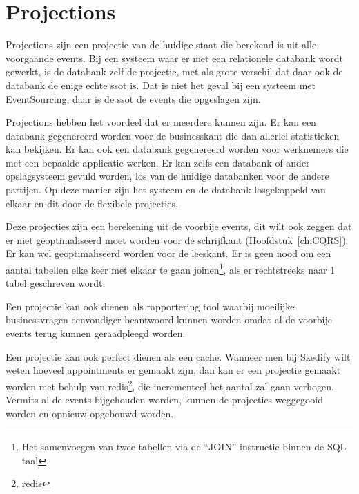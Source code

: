 
\section{Projections}
\label{sec:projections}

Projections zijn een projectie van de huidige staat die berekend is uit alle voorgaande events. Bij een systeem waar er met een relationele databank wordt gewerkt, is de databank zelf de projectie, met als grote verschil dat daar ook de databank de enige echte \gls{ssot} is. Dat is niet het geval bij een systeem met EventSourcing, daar is de \gls{ssot} de events die opgeslagen zijn.

Projections hebben het voordeel dat er meerdere kunnen zijn. Er kan een databank gegenereerd worden voor de businesskant die dan allerlei statistieken kan bekijken. Er kan ook een databank gegenereerd worden voor werknemers die met een bepaalde applicatie werken. Er kan zelfs een databank of ander opslagsysteem gevuld worden, los van de huidige databanken voor de andere partijen. Op deze manier zijn het systeem en de databank losgekoppeld van elkaar en dit door de flexibele projecties. 

Deze projecties zijn een berekening uit de voorbije events, dit wilt ook zeggen dat er niet geoptimaliseerd moet worden voor de schrijfkant (Hoofdstuk~\ref{ch:CQRS}). Er kan wel geoptimaliseerd worden voor de leeskant. Er is geen nood om een aantal tabellen elke keer met elkaar te gaan joinen\footnote{Het samenvoegen van twee tabellen via de ``JOIN'' instructie binnen de \gls{SQL} taal}, als er rechtstreeks naar 1 tabel geschreven wordt.

Een projectie kan ook dienen als rapportering tool waarbij moeilijke businessvragen eenvoudiger beantwoord kunnen worden omdat al de voorbije events terug kunnen geraadpleegd worden.

Een projectie kan ook perfect dienen als een \gls{cache}. Wanneer men bij Skedify wilt weten hoeveel appointments er gemaakt zijn, dan kan er een projectie gemaakt worden met behulp van \gls{redis}\footnote{\glsdesc{redis}}, die incrementeel het aantal zal gaan verhogen. Vermits al de events bijgehouden worden, kunnen de projecties weggegooid worden en opnieuw opgebouwd worden.
